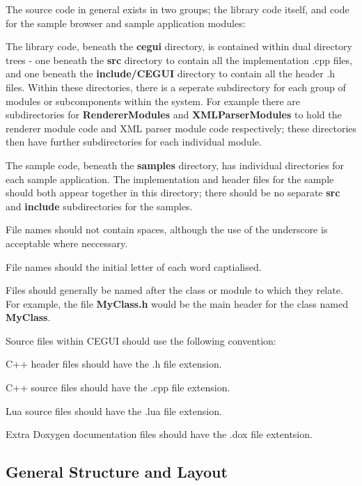 \begin{DoxyItemize}
\item The source code in general exists in two groups; the library code itself, and code for the sample browser and sample application modules\+:
\begin{DoxyItemize}
\item The library code, beneath the {\bfseries{cegui}} directory, is contained within dual directory trees -\/ one beneath the {\bfseries{src}} directory to contain all the implementation .cpp files, and one beneath the {\bfseries{include/\+C\+E\+G\+UI}} directory to contain all the header .h files. Within these directories, there is a seperate subdirectory for each group of modules or subcomponents within the system. For example there are subdirectories for {\bfseries{Renderer\+Modules}} and {\bfseries{X\+M\+L\+Parser\+Modules}} to hold the renderer module code and X\+ML parser module code respectively; these directories then have further subdirectories for each individual module.
\item The sample code, beneath the {\bfseries{samples}} directory, has individual directories for each sample application. The implementation and header files for the sample should both appear together in this directory; there should be no separate {\bfseries{src}} and {\bfseries{include}} subdirectories for the samples.
\end{DoxyItemize}
\item File names should not contain spaces, although the use of the underscore is acceptable where neccessary.
\item File names should the initial letter of each word captialised.
\item Files should generally be named after the class or module to which they relate. For example, the file {\bfseries{My\+Class.\+h}} would be the main header for the class named {\bfseries{My\+Class}}.
\item Source files within C\+E\+G\+UI should use the following convention\+:
\begin{DoxyItemize}
\item C++ header files should have the {\bfseries{}}.h file extension.
\item C++ source files should have the {\bfseries{}}.cpp file extension.
\item Lua source files should have the {\bfseries{}}.lua file extension.
\item Extra Doxygen documentation files should have the {\bfseries{}}.dox file extentsion.
\end{DoxyItemize}
\end{DoxyItemize}\hypertarget{code_standards_code_standards_sec_1_2}{}\subsection{General Structure and Layout}\label{code_standards_code_standards_sec_1_2}

